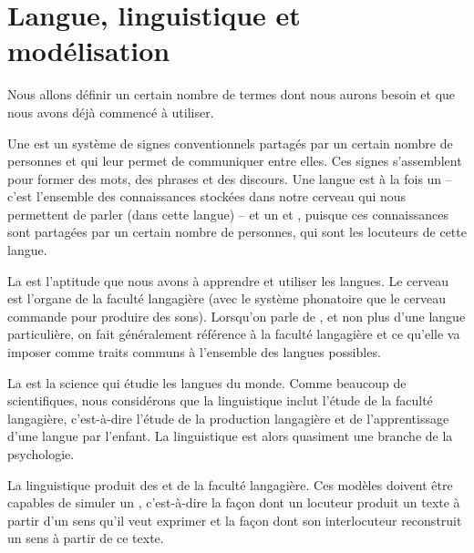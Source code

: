 \section{Langue, linguistique et modélisation}\label{sec:1.1.7}

Nous allons définir un certain nombre de termes dont nous aurons besoin et que nous avons déjà commencé à utiliser.


{Une  est un système de signes conventionnels partagés par un certain nombre de personnes et qui leur permet de communiquer entre elles. Ces signes s’assemblent pour former des mots, des phrases et des discours. Une langue est à la fois un  – c’est l’ensemble des connaissances stockées dans notre cerveau qui nous permettent de parler (dans cette langue) – et un  et , puisque ces connaissances sont partagées par un certain nombre de personnes, qui sont les locuteurs de cette langue.}

{La  est l’aptitude que nous avons à apprendre et utiliser les langues. Le cerveau est l’organe de la faculté langagière (avec le système phonatoire que le cerveau commande pour produire des sons). Lorsqu’on parle de , et non plus d’une langue particulière, on fait généralement référence à la faculté langagière et ce qu’elle va imposer comme traits communs à l’ensemble des langues possibles.}

{La  est la science qui étudie les langues du monde. Comme beaucoup de scientifiques, nous considérons que la linguistique inclut l’étude de la faculté langagière, c’est-à-dire l’étude de la production langagière et de l’apprentissage d’une langue par l’enfant. La linguistique est alors quasiment une branche de la psychologie.}

La linguistique produit des   et de la faculté langagière. Ces modèles doivent être capables de simuler un , c’est-à-dire la façon dont un locuteur produit un texte à partir d’un sens qu’il veut exprimer et la façon dont son interlocuteur reconstruit un sens à partir de ce texte.%


